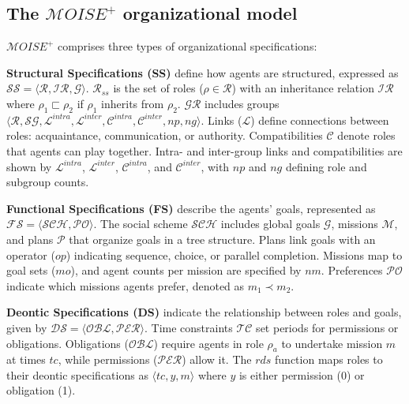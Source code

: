 \documentclass[pdflatex,sn-mathphys-num]{sn-jnl}%
\theoremstyle{thmstyleone}%
\theoremstyle{thmstyletwo}%
\theoremstyle{thmstylethree}%
\begin{document}
\subsection{The $\mathcal{M}OISE^+$ organizational model}

%     

$\mathcal{M}OISE^+$ comprises three types of organizational specifications:

\noindent \textbf{Structural Specifications (SS)} define how agents are structured, expressed as $\mathcal{SS} = \langle \mathcal{R}, \mathcal{IR}, \mathcal{G} \rangle$. $\mathcal{R}_{ss}$ is the set of roles ($\rho \in \mathcal{R}$) with an inheritance relation $\mathcal{IR}$ where $\rho_1 \sqsubset \rho_2$ if $\rho_1$ inherits from $\rho_2$. $\mathcal{GR}$ includes groups $\langle \mathcal{R}, \mathcal{SG}, \mathcal{L}^{intra}, \mathcal{L}^{inter}, \allowbreak \mathcal{C}^{intra}, \mathcal{C}^{inter}, np, ng \rangle$. Links ($\mathcal{L}$) define connections between roles: acquaintance, communication, or authority. Compatibilities $\mathcal{C}$ denote roles that agents can play together. Intra- and inter-group links and compatibilities are shown by $\mathcal{L}^{intra}$, $\mathcal{L}^{inter}$, $\mathcal{C}^{intra}$, and $\mathcal{C}^{inter}$, with $np$ and $ng$ defining role and subgroup counts.

\noindent \textbf{Functional Specifications (FS)} describe the agents' goals, represented as $\mathcal{FS} = \langle \mathcal{SCH}, \mathcal{PO} \rangle$. The social scheme $\mathcal{SCH}$ includes global goals $\mathcal{G}$, missions $\mathcal{M}$, and plans $\mathcal{P}$ that organize goals in a tree structure. Plans link goals with an operator ($op$) indicating sequence, choice, or parallel completion. Missions map to goal sets ($mo$), and agent counts per mission are specified by $nm$. Preferences $\mathcal{PO}$ indicate which missions agents prefer, denoted as $m_1 \prec m_2$.

\noindent \textbf{Deontic Specifications (DS)} indicate the relationship between roles and goals, given by $\mathcal{DS} = \langle \mathcal{OBL}, \mathcal{PER} \rangle$. Time constraints $\mathcal{TC}$ set periods for permissions or obligations. Obligations ($\mathcal{OBL}$) require agents in role $\rho_a$ to undertake mission $m$ at times $tc$, while permissions ($\mathcal{PER}$) allow it. The $rds$ function maps roles to their deontic specifications as $\langle tc, y, m \rangle$ where $y$ is either permission (0) or obligation (1).
\end{document}
